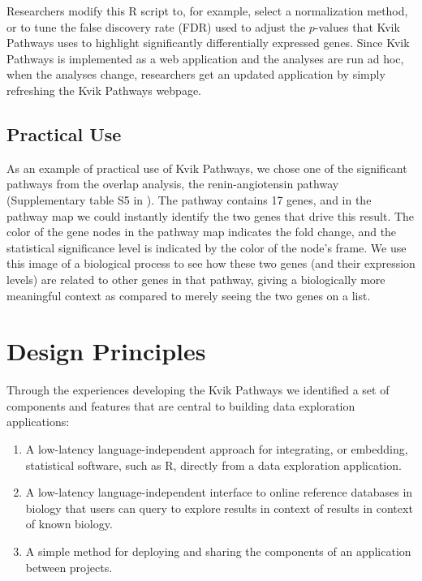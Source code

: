 Researchers modify this R script to, for example, select a normalization method,
or to tune the false discovery rate (FDR) used to adjust the $p$-values that
Kvik Pathways uses to highlight significantly differentially expressed genes.
Since Kvik Pathways is implemented as a web application and the analyses are run
ad hoc, when the analyses change, researchers get an updated application by
simply refreshing the Kvik Pathways webpage.

\subsection{Practical Use} 
As an example of practical use of Kvik Pathways, we chose one of the
significant pathways from the overlap analysis, the renin-angiotensin
pathway (Supplementary table S5 in \cite{olsen2013plasma}). The pathway
contains 17 genes, and in the pathway map we could instantly identify the
two genes that drive this result. The color of the gene nodes in the pathway
map indicates the fold change, and the statistical significance level is
indicated by the color of the node's frame.  We use this image of a
biological process to see how these two genes (and their expression levels)
are related to other genes in that pathway, giving a biologically more
meaningful context as compared to merely seeing the two genes on a list.


\section{Design Principles}\label{challengeref} 
Through the experiences developing the Kvik Pathways we identified a set of
components and features that are central to building data exploration
applications: 

\begin{enumerate}
    \item A low-latency language-independent approach for integrating, or
        embedding, statistical software, such as R, directly from a data
        exploration application. 
    \item A low-latency language-independent interface to online reference
        databases in biology that users can query to explore results in context
        of results in context of known biology. 
    \item A simple method for deploying and sharing the components of an
        application between projects. 
\end{enumerate} 


